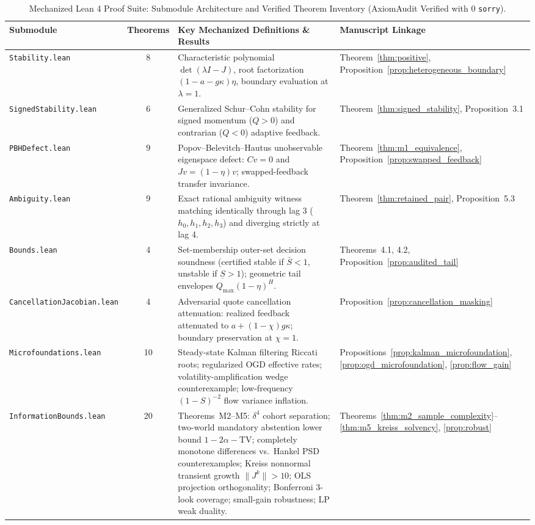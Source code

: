 \documentclass[10pt,twocolumn,letterpaper]{article}
\theoremstyle{definition}
\theoremstyle{remark}
\begin{document}
\begin{table}[htbp]
\centering\small
\caption{Mechanized Lean 4 Proof Suite: Submodule Architecture and Verified Theorem Inventory (AxiomAudit Verified with 0 \texttt{sorry}).}
\label{tab:lean4_submodules}
\begin{tabularx}{\textwidth}{lcp{}p{}}
\toprule
\textbf{Submodule} & \textbf{Theorems} & \textbf{Key Mechanized Definitions \& Results} & \textbf{Manuscript Linkage} \\
\midrule
\texttt{Stability.lean} & 8 & Characteristic polynomial $\det(\lambda I - J)$, root factorization $(1-a-g\kappa)\eta$, boundary evaluation at $\lambda = 1$. & Theorem~\ref{thm:positive}, Proposition~\ref{prop:heterogeneous_boundary} \\
\texttt{SignedStability.lean} & 6 & Generalized Schur--Cohn stability for signed momentum ($Q > 0$) and contrarian ($Q < 0$) adaptive feedback. & Theorem~\ref{thm:signed_stability}, Proposition~3.1 \\
\texttt{PBHDefect.lean} & 9 & Popov--Belevitch--Hautus unobservable eigenspace defect: $Cv = 0$ and $Jv = (1-\eta)v$; swapped-feedback transfer invariance. & Theorem~\ref{thm:m1_equivalence}, Proposition~\ref{prop:swapped_feedback} \\
\texttt{Ambiguity.lean} & 9 & Exact rational ambiguity witness matching identically through lag 3 ($h_0, h_1, h_2, h_3$) and diverging strictly at lag 4. & Theorem~\ref{thm:retained_pair}, Proposition~5.3 \\
\texttt{Bounds.lean} & 4 & Set-membership outer-set decision soundness (certified stable if $\bar{S} < 1$, unstable if $\underline{S} > 1$); geometric tail envelopes $Q_{\max}(1-\eta)^H$. & Theorems~4.1, 4.2, Proposition~\ref{prop:audited_tail} \\
\texttt{CancellationJacobian.lean} & 4 & Adversarial quote cancellation attenuation: realized feedback attenuated to $a + (1-\chi)g\kappa$; boundary preservation at $\chi = 1$. & Proposition~\ref{prop:cancellation_masking} \\
\texttt{Microfoundations.lean} & 10 & Steady-state Kalman filtering Riccati roots; regularized OGD effective rates; volatility-amplification wedge counterexample; low-frequency $(1-S)^{-2}$ flow variance inflation. & Propositions~\ref{prop:kalman_microfoundation}, \ref{prop:ogd_microfoundation}, \ref{prop:flow_gain} \\
\texttt{InformationBounds.lean} & 20 & Theorems~M2--M5: $\delta^4$ cohort separation; two-world mandatory abstention lower bound $1 - 2\alpha - \mathrm{TV}$; completely monotone differences vs.\ Hankel PSD counterexamples; Kreiss nonnormal transient growth $\|J^k\| > 10$; OLS projection orthogonality; Bonferroni 3-look coverage; small-gain robustness; LP weak duality. & Theorems~\ref{thm:m2_sample_complexity}--\ref{thm:m5_kreiss_solvency}, \cref{prop:robust} \\

\end{tabularx}
\end{table}
\end{document}
